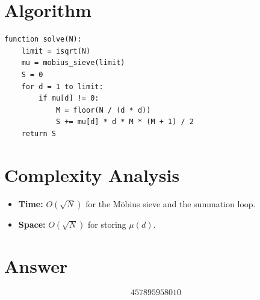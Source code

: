 \documentclass[11pt]{article}
\begin{document}
\section{Algorithm}

\begin{verbatim}
function solve(N):
    limit = isqrt(N)
    mu = mobius_sieve(limit)
    S = 0
    for d = 1 to limit:
        if mu[d] != 0:
            M = floor(N / (d * d))
            S += mu[d] * d * M * (M + 1) / 2
    return S
\end{verbatim}

\section{Complexity Analysis}

\begin{itemize}
\item \textbf{Time:} $O(\sqrt{N})$ for the M\"obius sieve and the summation loop.
\item \textbf{Space:} $O(\sqrt{N})$ for storing $\mu(d)$.
\end{itemize}

\section{Answer}

\[
\boxed{457895958010}
\]
\end{document}

